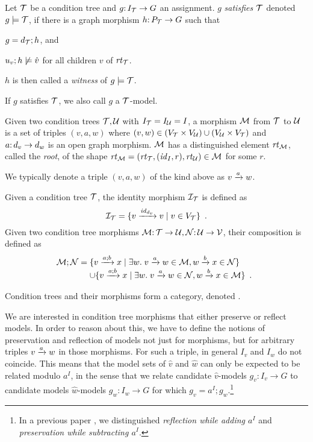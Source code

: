 \begin{definition}[satisfaction]\label{def:satisfaction}
Let ${\mathcal{T}}$ be a condition tree and $g{:}\, I_{\mathcal{T}}\rightarrow G$ an assignment. $g$ \emph{satisfies ${\mathcal{T}}$} denoted $g\models {\mathcal{T}}$, if there is a graph morphism $h{:}\, P_{\mathcal{T}}\rightarrow G$ such that
\begin{inumerate}
\item $g=d_{\mathcal{T}};h$, and 
\item $u_v;h\not\models \hat v$ for all children $v$ of $\mathit{rt}_{{\mathcal{T}}}$.
\end{inumerate}
$h$ is then called a \emph{witness} of $g\models {\mathcal{T}}$.
\end{definition}
%
If $g$ satisfies ${\mathcal{T}}$, we also call $g$ a ${\mathcal{T}}$-model.


\begin{definition}[morphism]
Given two condition trees ${\mathcal{T}},{\mathcal{U}}$ with $I_{\mathcal{T}}=I_{\mathcal{U}}=I$, a morphism ${\mathcal{M}}$ from ${\mathcal{T}}$ to ${\mathcal{U}}$ is a set of triples $(v,a,w)$ where $(v,w)\in (V_{\mathcal{T}}\times V_{\mathcal{U}})\cup (V_{\mathcal{U}}\times V_{\mathcal{T}})$ and $a{:}\, d_v\rightarrow d_w$ is an open graph morphism. ${\mathcal{M}}$ has a distinguished element $\mathit{rt}_{{\mathcal{M}}}$, called the \emph{root}, of the shape $\mathit{rt}_{{\mathcal{M}}}=(\mathit{rt}_{{\mathcal{T}}},({\mathit{id}}_I,r),\mathit{rt}_{{\mathcal{U}}})\in {\mathcal{M}}$ for some $r$.
\end{definition}
%
We typically denote a triple $(v,a,w)$ of the kind above as $v\xrightarrow{a} w$.

Given a condition tree ${\mathcal{T}}$, the identity morphism ${\mathcal{I}}_{\mathcal{T}}$ is defined as
\[ {\mathcal{I}}_{\mathcal{T}} = \{{{v}\xrightarrow{{\mathit{id}}_{d_v}}{v} \mid v\in V_{\mathcal{T}}}\} \enspace. \]
Given two condition tree morphisms ${\mathcal{M}}{:}\, {\mathcal{T}}\rightarrow {\mathcal{U}},{\mathcal{N}}{:}\, {\mathcal{U}}\rightarrow {\mathcal{V}}$, their composition is defined as
\[ \cM;\cN =
\begin{array}[t]{@{}l}
	\setof{\trip v{a;b}x \mid \exists w\st \trip v a w\in\cM, \trip wbx\in \cN} \\
	\cup \setof{\trip v{a;b}x \mid \exists w\st \trip vaw\in\cN, \trip wbx\in\cM} \enspace.
\end{array}
\]

\begin{proposition}
Condition trees and their morphisms form a category, denoted {\CT}.
\end{proposition}
%
We are interested in condition tree morphisms that either preserve or reflect models. In order to reason about this, we have to define the notions of preservation and reflection of models not just for morphisms, but for arbitrary triples ${v}\xrightarrow{a}{w}$ in those morphisms. For such a triple, in general $I_v$ and $I_w$ do not coincide. This means that the model sets of $\hat v$ and $\hat w$ can only be expected to be related modulo $a^I$, in the sense that we relate candidate $\hat v$-models $g_v:I_v\to G$ to candidate models $\hat w$-models $g_w:I_w\to G$ for which $g_v=a^I;g_w$.\footnote{In a previous paper \cite{RensCorr}, we distinguished \emph{reflection while adding $a^I$} and \emph{preservation while subtracting $a^I$}.}

